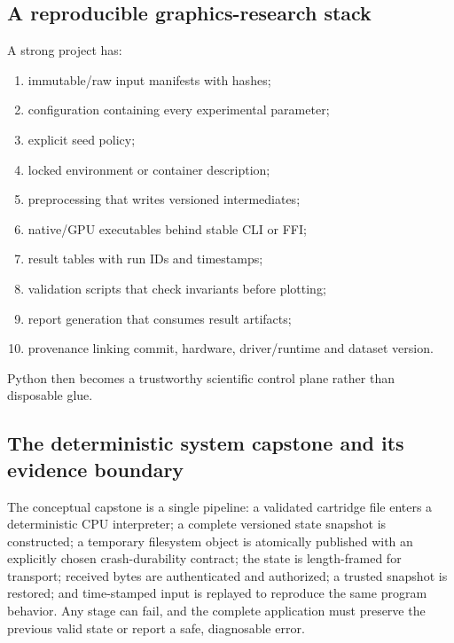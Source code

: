 \subsection{A reproducible graphics-research stack}\label{01-foundations-i-ch017-a-reproducible-graphics-research-stack}

A strong project has:

\begin{enumerate}
\def\labelenumi{\arabic{enumi}.}
\tightlist
\item
  immutable/raw input manifests with hashes;
\item
  configuration containing every experimental parameter;
\item
  explicit seed policy;
\item
  locked environment or container description;
\item
  preprocessing that writes versioned intermediates;
\item
  native/GPU executables behind stable CLI or FFI;
\item
  result tables with run IDs and timestamps;
\item
  validation scripts that check invariants before plotting;
\item
  report generation that consumes result artifacts;
\item
  provenance linking commit, hardware, driver/runtime and dataset version.
\end{enumerate}

Python then becomes a trustworthy scientific control plane rather than disposable glue.

\subsection{The deterministic system capstone and its evidence boundary}\label{01-foundations-i-ch017-the-deterministic-system-capstone-and-its-evidence-boundary}

The conceptual capstone is a single pipeline: a validated cartridge file enters a deterministic CPU interpreter; a complete versioned state snapshot is constructed; a temporary filesystem object is atomically published with an explicitly chosen crash-durability contract; the state is length-framed for transport; received bytes are authenticated and authorized; a trusted snapshot is restored; and time-stamped input is replayed to reproduce the same program behavior. Any stage can fail, and the complete application must preserve the previous valid state or report a safe, diagnosable error.

